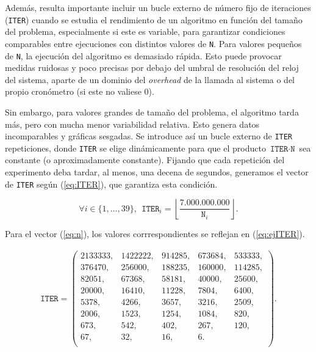 \documentclass[11pt,a4paper,twoside]{article}
\theoremstyle{definition}
\begin{document}
	Además, resulta importante incluir un bucle externo de número fijo de iteraciones (\texttt{ITER}) cuando se estudia el rendimiento de un algoritmo en función del tamaño del problema, especialmente si este es variable, para garantizar condiciones comparables entre ejecuciones con distintos valores de \texttt{N}. Para valores pequeños de \texttt{N}, la ejecución del algoritmo es demasiado rápida. Esto puede provocar medidas ruidosas y poco precisas por debajo del umbral de resolución del reloj del sistema, aparte de un dominio del \textit{overhead} de la llamada al sistema o del propio cronómetro (si este no valiese 0).
	
	Sin embargo, para valores grandes de tamaño del problema, el algoritmo tarda más, pero con mucha menor variabilidad relativa. Esto genera datos incomparables y gráficas sesgadas. Se introduce así un bucle externo de \texttt{ITER} repeticiones, donde \texttt{ITER} se elige dinámicamente para que el producto $\texttt{ITER} \cdot \texttt{N}$ sea constante (o aproximadamente constante). Fijando que cada repetición del experimento deba tardar, al menos, una decena de segundos, generamos el vector de \texttt{ITER} según (\ref{eq:ITER}), que garantiza esta condición.
	
	\begin{equation} \label{eq:ITER}
		\forall i \in \lbrace 1, \dots, 39 \rbrace, \:\: \texttt{ITER}_i = \left\lfloor \dfrac{7.000.000.000}{\texttt{N}_i} \right\rfloor.
	\end{equation}

	Para el vector (\ref{eq:n}), los valores corrrespondientes se reflejan en (\ref{eq:ejITER}).
	
	\begin{equation} \label{eq:ejITER}
		\begin{aligned}
			\texttt{ITER} = \left(
			\begin{matrix}
				2133333, & 1422222, & 914285, & 673684, & 533333, \\
				376470, & 256000, & 188235, & 160000, & 114285, \\
				82051, & 67368, & 58181, & 40000, & 25600, \\
				20000, & 16410, & 11228, & 7804, & 6400, \\
				5378, & 4266, & 3657, & 3216, & 2509, \\
				2006, & 1523, & 1254, & 1084, & 820, \\
				673, & 542, & 402, & 267, & 120, \\
				67, & 32, & 16, & 6. &  \\
			\end{matrix}
			\right).
		\end{aligned}
	\end{equation}
\end{document}
